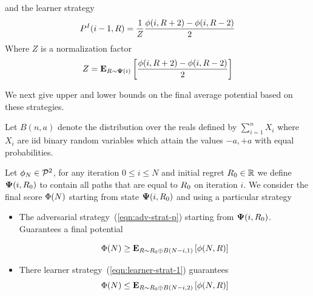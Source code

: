 \documentclass{article}[12pt]
\begin{document}
and the learner strategy
\begin{equation} \label{eqn:learner-strat-1}
P^I(i-1,R) = \frac{1}{Z} \frac{\phi(i,R+2) - \phi(i,R-2)}{2}
\end{equation}
Where $Z$ is a normalization factor
$$Z = {\bf E}_{R \sim {\bf \Psi}(i)}\left[ \frac{\phi(i,R+2) - \phi(i,R-2)}{2} \right]$$

We next give upper and lower bounds on the final average potential
based on these strategies.

Let $B(n,a)$ denote the distribution over the reals defined by
$\sum_{i=1}^n X_i$ where $X_i$ are iid binary random variables which
attain the values $-a,+a$ with equal probabilities.

\begin{theorem} \label{thm:IntegerGameBounds}
  Let $\phi_N \in {\cal P}^{2}$, for any iteration $0 \leq i \leq N$ and
  initial regret $R_0 \in \mathbb{R}$ we define ${\bf \Psi}(i,R_0)$ to
  contain all paths that are equal to $R_0$ on iteration $i$. We
  consider the final score $\Phi(N)$ starting from state
  ${\bf \Psi}(i,R_0)$ and using a particular strategy
  \begin{itemize}
  \item
    The adversarial strategy~(\ref{eqn:adv-strat-p}) starting from
    ${\bf \Psi}(i,R_0)$. Guarantees a final potential 
     
    $$\Phi(N) \geq {\bf E}_{R \sim R_0 \oplus B(N-i,1)}\left[ \phi(N,R) \right]$$
  \item
    There learner strategy~(\ref{eqn:learner-strat-1}) guarantees 
    $$\Phi(N) \leq {\bf E}_{R \sim R_0 \oplus B(N-i,2)}\left[ \phi(N,R) \right]$$
  \end{itemize}
\end{theorem}

\end{document}
